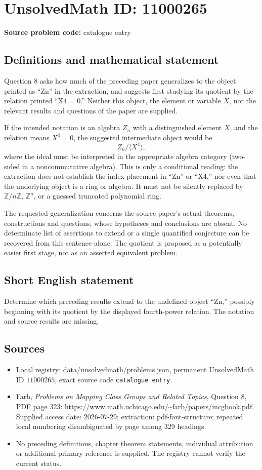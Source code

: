 \documentclass[11pt]{article}
\newcommand{\Z}{\mathbb{Z}}
\begin{document}
\section*{UnsolvedMath ID: 11000265}
\textbf{Source problem code:} catalogue entry
\subsection{Definitions and mathematical statement}
Question 8 asks how much of the preceding paper generalizes to the object printed as ``Zn'' in the extraction, and suggests first studying its quotient by the relation printed ``X4 = 0.'' Neither this object, the element or variable $X$, nor the relevant results and questions of the paper are supplied.

If the intended notation is an algebra $Z_n$ with a distinguished element $X$, and the relation means $X^4=0$, the suggested intermediate object would be
\[
 Z_n/\langle X^4\rangle,
\]
where the ideal must be interpreted in the appropriate algebra category (two-sided in a noncommutative algebra). This is only a conditional reading: the extraction does not establish the index placement in ``Zn'' or ``X4,'' nor even that the underlying object is a ring or algebra. It must not be silently replaced by $\Z/n\Z$, $\Z^n$, or a guessed truncated polynomial ring.

The requested generalization concerns the source paper's actual theorems, constructions and questions, whose hypotheses and conclusions are absent. No determinate list of assertions to extend or a single quantified conjecture can be recovered from this sentence alone. The quotient is proposed as a potentially easier first stage, not as an asserted equivalent problem.
\subsection{Short English statement}
Determine which preceding results extend to the undefined object ``Zn,'' possibly beginning with its quotient by the displayed fourth-power relation. The notation and source results are missing.
\subsection{Sources}
\begin{itemize}
\item Local registry: \url{data/unsolvedmath/problems.json}, permanent UnsolvedMath ID $11000265$, exact source code \texttt{catalogue entry}.
\item Farb, \emph{Problems on Mapping Class Groups and Related Topics}, Question 8, PDF page 323: \url{https://www.math.uchicago.edu/~farb/papers/mcgbook.pdf}. Supplied access date: 2026-07-29; extraction: pdf-font-structure; repeated local numbering disambiguated by page among 329 headings.
\item No preceding definitions, chapter theorem statements, individual attribution or additional primary reference is supplied. The registry cannot verify the current status.
\end{itemize}
\end{document}
